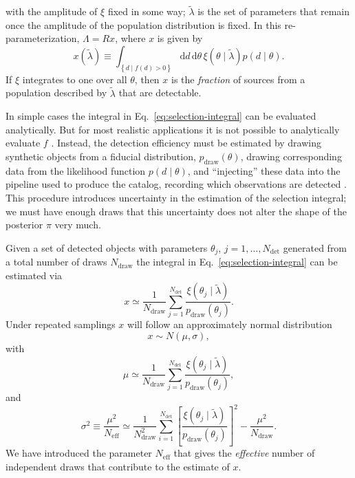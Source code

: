 \documentclass[modern]{aastex62}
\newcommand{\dd}{\mathrm{d}}
\newcommand{\Ndraw}{N_\mathrm{draw}}
\newcommand{\Ndet}{N_\mathrm{det}}
\newcommand{\Neff}{N_\mathrm{eff}}
\newcommand{\pdraw}{p_\mathrm{draw}}
\begin{document}
%
with the amplitude of $\xi$ fixed in some way; $\tilde{\lambda}$ is the set of
parameters that remain once the amplitude of the population distribution is
fixed.  In this re-parameterization, $\Lambda = R x$, where $x$ is given by
%
\begin{equation}
  \label{eq:selection-integral}
  x\left( \tilde{\lambda} \right) \equiv \int_{\left\{ d \mid f(d) > 0 \right\}} \dd d \, \dd \theta \, \xi\left( \theta \mid \tilde{\lambda} \right) p\left( d \mid \theta \right).
\end{equation}
%
If $\xi$ integrates to one over all $\theta$, then $x$ is the \emph{fraction} of
sources from a population described by $\tilde{\lambda}$ that are detectable.

In simple cases the integral in Eq.\ \eqref{eq:selection-integral} can be
evaluated analytically.  But for most realistic applications it is not possible
to analytically evaluate $f$ \citep[see
e.g.][]{Burke2015,Christainsen2015,GW150914-Rate,GW150914-Rate-Supplement,Burke2017}.
Instead, the detection efficiency must be estimated by drawing synthetic objects
from a fiducial distribution, $\pdraw\left( \theta \right)$, drawing
corresponding data from the likelihood function $p\left( d \mid \theta \right)$,
and ``injecting'' these data into the pipeline used to produce the catalog,
recording which observations are detected \citep{Tiwari2018}.  This procedure
introduces uncertainty in the estimation of the selection integral; we must have
enough draws that this uncertainty does not alter the shape of the posterior
$\pi$ very much.

Given a set of detected objects with parameters $\theta_j$, $j = 1, \ldots,
\Ndet$ generated from a total number of draws $\Ndraw$ the integral in Eq.\
\eqref{eq:selection-integral} can be estimated via
%
\begin{equation}
  \label{eq:simple-monte-carlo-estimate}
  x \simeq \frac{1}{\Ndraw} \sum_{j=1}^{\Ndet} \frac{\xi\left( \theta_j \mid \tilde{\lambda} \right)}{\pdraw\left( \theta_j \right)}.
\end{equation}
%
Under repeated samplings $x$ will follow an approximately normal distribution
%
\begin{equation}
    x \sim N\left( \mu, \sigma \right),
\end{equation}
%
with
%
\begin{equation}
  \mu \simeq \frac{1}{\Ndraw} \sum_{j=1}^{\Ndet} \frac{\xi\left( \theta_j \mid \tilde{\lambda} \right)}{\pdraw\left( \theta_j \right)} ,
\end{equation}
%
and
%
\begin{equation}
    \sigma^2 \equiv \frac{\mu^2}{\Neff} \simeq \frac{1}{\Ndraw^2} \sum_{i=1}^{\Ndet} \left[ \frac{\xi\left( \theta_j \mid \tilde{\lambda} \right)}{\pdraw\left( \theta_j \right)} \right]^2 - \frac{\mu^2}{\Ndraw}.
\end{equation}
%
We have introduced the parameter $\Neff$ that gives the \emph{effective} number
of independent draws that contribute to the estimate of $x$.
\end{document}
